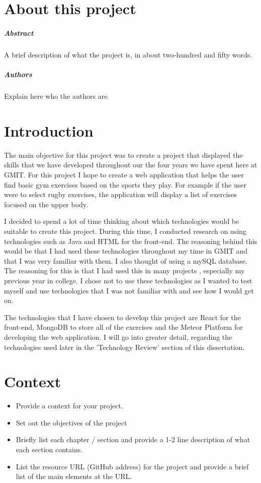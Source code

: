 
\chapter*{About this project}
\paragraph{Abstract}
A brief description of what the project is, in about two-hundred and fifty words.

\paragraph{Authors}
Explain here who the authors are.



\chapter{Introduction}
The main objective for this project was to create a project that displayed the skills that we have developed throughout our the four years we have spent here at GMIT. For this project I hope to create a web application that helps the user find basic gym exercises based on the sports they play. For example if the user were to select rugby exercises, the application will display a list of exercises focused on the  upper body.

I decided to spend a lot of time thinking about which technologies would be suitable to create this project. During this time, I conducted research on using technologies such as Java and HTML for the front-end. The reasoning behind this would be that I had used these technologies throughout my time in GMIT and that I was very familiar with them. I also thought of using a mySQL database. The reasoning for this is that I had used this in many projects , especially my previous year in college. I chose not to use these technologies as I wanted to test myself and use technologies that I was not familiar with and see how I would get on.

The technologies that I have chosen to develop this project are React for the front-end, MongoDB to store all of the exercises and the Meteor Platform for developing the web application. I will go into greater detail, regarding the technologies used later in the 'Technology Review' section of this dissertation.

\chapter{Context}
\begin{itemize}
\item Provide a context for your project.
\item Set out the objectives of the project
\item Briefly list each chapter / section and provide a 1-2 line description of what each section contains.
\item List the resource URL (GitHub address) for the project and provide a brief list of the main elements at the URL.
\end{itemize}

